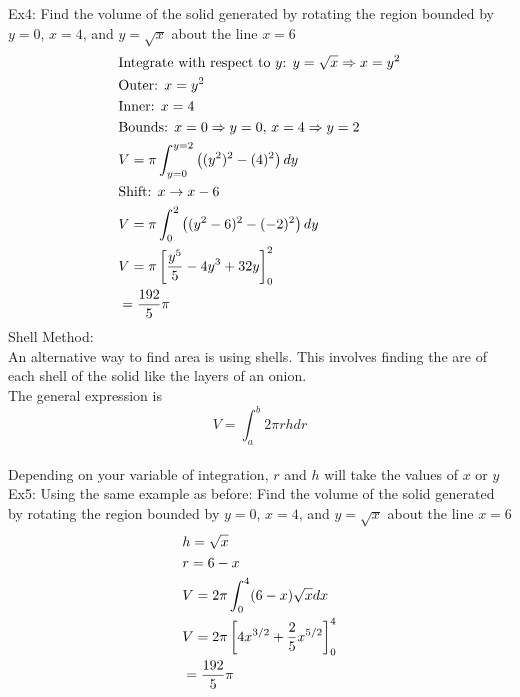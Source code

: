 \documentclass[11pt, fleqn]{article}
\begin{document}
Ex4: Find the volume of the solid generated by rotating the region bounded by $y=0$, $x=4$, and $y=\sqrt{x}$ about the line $x=6$
\begin{align*}
    &\text{Integrate with respect to $y$: }y=\sqrt{x}\Rightarrow x=y^2\\
    &\text{Outer: }x=y^2\\
    &\text{Inner: }x=4\\
    &\text{Bounds: }x=0\Rightarrow y=0,\,x=4\Rightarrow y=2\\
    &V=\pi\int_{y=0}^{y=2}\left( (y^2)^2-(4)^2 \right)dy\\
    &\text{Shift: }x\to x-6\\
    &V=\pi\int_0^2\left( (y^2-6)^2-(-2)^2 \right)dy\\
    &V=\pi\left[ \frac{y^5}{5}-4y^3+32y \right]_0^2\\
    &=\frac{192}{5}\pi
\end{align*}
Shell Method:\\
An alternative way to find area is using shells. This involves finding the are of each shell of the solid like the layers of an onion.\\
The general expression is
$$V=\int_a^b2\pi rhdr$$\\
Depending on your variable of integration, $r$ and $h$ will take the values of $x$ or $y$\\
Ex5: Using the same example as before: Find the volume of the solid generated by rotating the region bounded by $y=0$, $x=4$, and $y=\sqrt{x}$ about the line $x=6$
\begin{align*}
    &h=\sqrt{x}\\
    &r=6-x\\
    &V=2\pi\int_0^4(6-x)\sqrt{x}dx\\
    &V=2\pi\left[ 4x^{3/2}+\frac{2}{5}x^{5/2} \right]_0^4\\
    &=\frac{192}{5}\pi
\end{align*}
\end{document}
